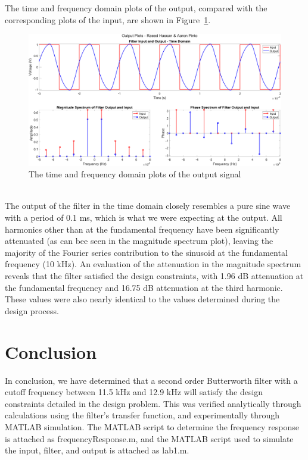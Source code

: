 \documentclass[12pt]{article}
\begin{document}
The time and frequency domain plots of the output, compared with the corresponding plots of the input, are shown in Figure~\ref{fig:output}. 
\begin{figure}[h!]
    \includegraphics[width=\textwidth]{output.png}
    \caption{\label{fig:output} The time and frequency domain plots of the output signal}
\end{figure} \\
The output of the filter in the time domain closely resembles a pure sine wave with a period of 0.1 ms, which is what we were expecting at the output. All harmonics other than at the fundamental frequency have been significantly attenuated (as can bee seen in the magnitude spectrum plot), leaving the majority of the Fourier series contribution to the sinusoid at the fundamental frequency (10 kHz). An evaluation of the attenuation in the magnitude spectrum reveals that the filter satisfied the design constraints, with 1.96 dB attenuation at the fundamental frequency and 16.75 dB attenuation at the third harmonic. These values were also nearly identical to the values determined during the design process.

\clearpage
\section*{Conclusion}
In conclusion, we have determined that a second order Butterworth filter with a cutoff frequency between 11.5 kHz and 12.9 kHz will satisfy the design constraints detailed in the design problem. This was verified analytically through calculations using the filter's transfer function, and experimentally through MATLAB simulation. The MATLAB script to determine the frequency response is attached as frequencyResponse.m, and the MATLAB script used to simulate the input, filter, and output is attached as lab1.m.
\end{document}
